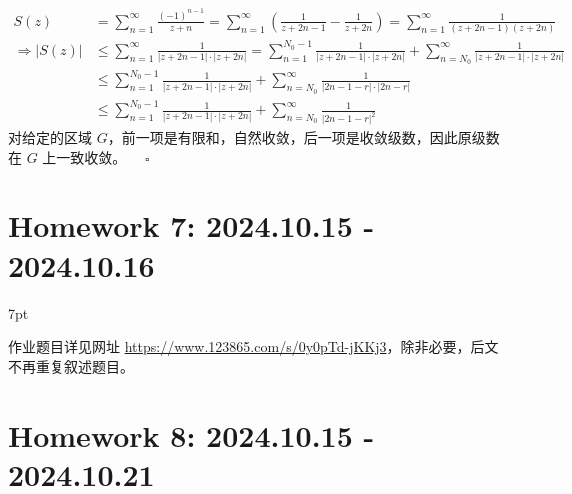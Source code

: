 \documentclass[UTF8]{report}
\theoremstyle{MyLineTheoremStyle} %
\theoremstyle{MyBlockTheoremStyle} %
\theoremstyle{MySubsubsectionStyle} %
\newenvironment{graybox}{%
        \def\FrameCommand{%
        \hspace{1pt}%
        {\color{gray}\small \vrule width 2pt}%
        {\color{graybox_color}\vrule width 4pt}%
        \colorbox{graybox_color}%
        }%
        \MakeFramed{\advance\hsize-\width\FrameRestore}%
        \noindent\hspace{-4.55pt}%
        \begin{adjustwidth}{}{7pt}%
        \vspace{2pt}\vspace{2pt}%
        }
        {%
        \vspace{2pt}\end{adjustwidth}\endMakeFramed%
        }
\begin{document}
\begin{align}
S(z) 
&= \sum_{n=1}^{\infty} \frac{(-1)^{n-1}}{z + n}
= \sum_{n=1}^{\infty} \left( \frac{1}{z+ 2n -1} - \frac{1}{z + 2n } \right)
= \sum_{n=1}^{\infty} \frac{1}{ (z + 2n -1)(z + 2n) } 
\\
\Longrightarrow  
\left| S(z) \right| 
&\leqslant \sum_{n=1}^{\infty} \frac{1}{\left| z + 2n -1 \right|  \cdot \left| z + 2n \right| } 
= \sum_{n=1}^{N_0 - 1} \frac{1}{\left| z + 2n -1 \right|  \cdot \left| z + 2n \right| }  + \sum_{n=N_0}^{\infty} \frac{1}{\left| z + 2n -1 \right|  \cdot \left| z + 2n \right| } 
\\ 
& \leqslant \sum_{n=1}^{N_0 - 1} \frac{1}{\left| z + 2n -1 \right|  \cdot \left| z + 2n \right| }  + \sum_{n=N_0}^{\infty} \frac{1}{\left|2n -1 - r \right|  \cdot \left|2n - r\right| } 
\\
& \leqslant \sum_{n=1}^{N_0 - 1} \frac{1}{\left| z + 2n -1 \right|  \cdot \left| z + 2n \right| }  + \sum_{n=N_0}^{\infty} \frac{1}{\left|2n -1 - r \right|^2 } 
\end{align}
对给定的区域 $G$，前一项是有限和，自然收敛，后一项是收敛级数，因此原级数在 $G$ 上一致收敛。 $\quad\square$

\chapter{Homework 7: 2024.10.15 - 2024.10.16}
\thispagestyle{fancy}
\vspace*{-6mm}
\begin{graybox}
作业题目详见网址 \href{https://www.123865.com/s/0y0pTd-jKKj3}{https://www.123865.com/s/0y0pTd-jKKj3}，除非必要，后文不再重复叙述题目。
\end{graybox}


\chapter{Homework 8: 2024.10.15 - 2024.10.21}
\thispagestyle{fancy}
\end{document}
